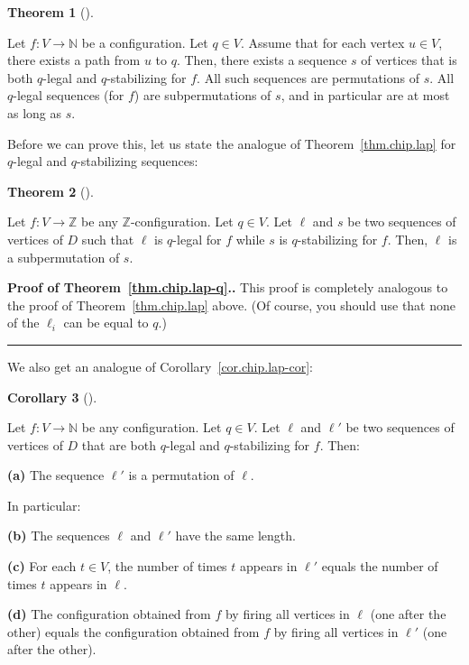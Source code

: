 \documentclass[numbers=enddot,12pt,final,onecolumn,notitlepage]{scrartcl}%
\theoremstyle{definition}
\newtheorem{theo}{Theorem}[section]
\newenvironment{theorem}[1][]
{\begin{theo}[#1]\begin{leftbar}}
{\end{leftbar}\end{theo}}
\newtheorem{coro}[theo]{Corollary}
\newenvironment{corollary}[1][]
{\begin{coro}[#1]\begin{leftbar}}
{\end{leftbar}\end{coro}}
\newenvironment{proof}[1][Proof]{\noindent\textbf{#1.} }{\ \rule{0.5em}{0.5em}}
\newcommand{\NN}{\mathbb{N}}
\newcommand{\ZZ}{\mathbb{Z}}
\begin{document}
\begin{theorem} \label{thm.chip.dichotomy-q}
Let $f : V \to \NN$ be a configuration.
Let $q \in V$.
Assume that for each vertex $u \in V$, there exists a path
from $u$ to $q$.
Then, there exists a sequence $s$ of vertices that is both
$q$-legal and $q$-stabilizing for $f$.
All such sequences are permutations of $s$.
All $q$-legal sequences (for $f$) are subpermutations
of $s$, and in particular are at most as long as $s$.
\end{theorem}

Before we can prove this, let us state the analogue of
Theorem~\ref{thm.chip.lap} for $q$-legal and
$q$-stabilizing sequences:

\begin{theorem} \label{thm.chip.lap-q}
Let $f : V \to \ZZ$ be any $\ZZ$-configuration.
Let $q \in V$.
Let $\ell$ and $s$ be two sequences of vertices of $D$ such
that $\ell$ is $q$-legal for $f$ while $s$ is
$q$-stabilizing for $f$.
Then, $\ell$ is a subpermutation of $s$.
\end{theorem}

\begin{proof}[Proof of Theorem~\ref{thm.chip.lap-q}.]
This proof is completely analogous to the proof
of Theorem~\ref{thm.chip.lap} above.
(Of course, you should use that none of the $\ell_i$
can be equal to $q$.)
\end{proof}

We also get an analogue of Corollary~\ref{cor.chip.lap-cor}:

\begin{corollary} \label{cor.chip.lap-cor-q}
Let $f : V \to \NN$ be any configuration.
Let $q \in V$.
Let $\ell$ and $\ell'$ be two sequences of vertices of $D$
that are both $q$-legal and $q$-stabilizing for $f$.
Then:

\textbf{(a)} The sequence $\ell'$ is a permutation of $\ell$.

In particular:

\textbf{(b)} The sequences $\ell$ and $\ell'$ have the
same length.

\textbf{(c)} For each $t \in V$, the number of times $t$
appears in $\ell'$ equals the number of times $t$ appears in
$\ell$.

\textbf{(d)} The configuration obtained from $f$ by firing
all vertices in $\ell$ (one after the other) equals the
configuration obtained from $f$ by firing
all vertices in $\ell'$ (one after the other).
\end{corollary}
\end{document}
